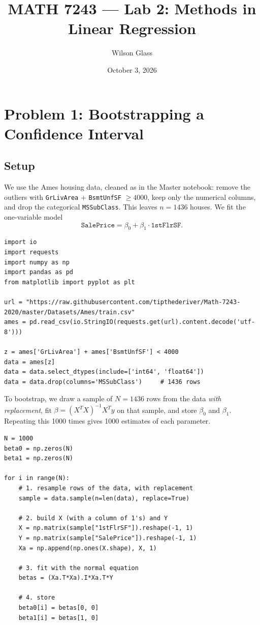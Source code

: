 \documentclass[11pt]{article}
\title{MATH 7243 --- Lab 2: Methods in Linear Regression}
\author{Wilson Glass}
\date{October 3, 2026}
\begin{document}
\maketitle

\section*{Problem 1: Bootstrapping a Confidence Interval}

\subsection*{Setup}

We use the Ames housing data, cleaned as in the Master notebook: remove the outliers
with \texttt{GrLivArea} + \texttt{BsmtUnfSF} $\ge 4000$, keep only the numerical
columns, and drop the categorical \texttt{MSSubClass}. This leaves $n = 1436$ houses.
We fit the one-variable model
\[
  \texttt{SalePrice} = \beta_0 + \beta_1 \cdot \texttt{1stFlrSF}.
\]

\begin{lstlisting}
import io
import requests
import numpy as np
import pandas as pd
from matplotlib import pyplot as plt

url = "https://raw.githubusercontent.com/tipthederiver/Math-7243-2020/master/Datasets/Ames/train.csv"
ames = pd.read_csv(io.StringIO(requests.get(url).content.decode('utf-8')))

z = ames['GrLivArea'] + ames['BsmtUnfSF'] < 4000
data = ames[z]
data = data.select_dtypes(include=['int64', 'float64'])
data = data.drop(columns='MSSubClass')     # 1436 rows
\end{lstlisting}

To bootstrap, we draw a sample of $N = 1436$ rows from the data \emph{with
replacement}, fit $\beta = (X^TX)^{-1}X^Ty$ on that sample, and store $\beta_0$ and
$\beta_1$. Repeating this 1000 times gives 1000 estimates of each parameter.

\begin{lstlisting}
N = 1000
beta0 = np.zeros(N)
beta1 = np.zeros(N)

for i in range(N):
    # 1. resample rows of the data, with replacement
    sample = data.sample(n=len(data), replace=True)

    # 2. build X (with a column of 1's) and Y
    X = np.matrix(sample["1stFlrSF"]).reshape(-1, 1)
    Y = np.matrix(sample["SalePrice"]).reshape(-1, 1)
    Xa = np.append(np.ones(X.shape), X, 1)

    # 3. fit with the normal equation
    betas = (Xa.T*Xa).I*Xa.T*Y

    # 4. store
    beta0[i] = betas[0, 0]
    beta1[i] = betas[1, 0]
\end{lstlisting}
\end{document}

